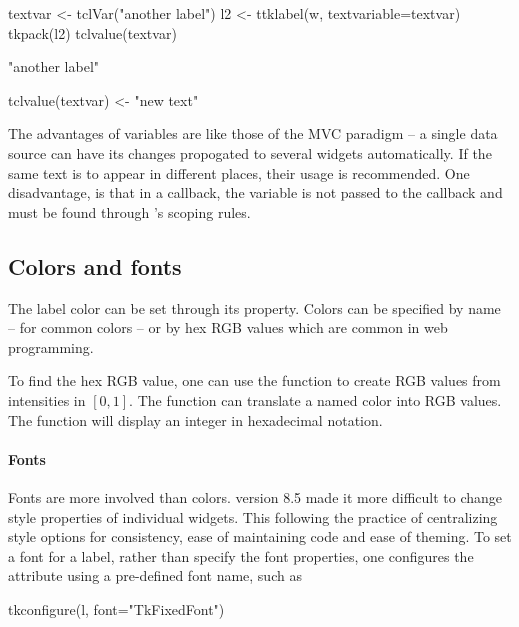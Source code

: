 \begin{Schunk}
\begin{Sinput}
 textvar <- tclVar("another label")
 l2 <- ttklabel(w, textvariable=textvar)
 tkpack(l2)
 tclvalue(textvar)
\end{Sinput}
\begin{Soutput}
[1] "another label"
\end{Soutput}
\begin{Sinput}
 tclvalue(textvar) <- "new text"         
\end{Sinput}
\end{Schunk}

The advantages of \TCL\/ variables are like those of the MVC paradigm
-- a single data source can have its changes propogated to several
widgets automatically. If the same text is to appear in different
places, their usage is recommended.  One disadvantage, is that in a
callback, the variable is not passed to the callback and must be found
through \R's scoping rules.

\subsection{Colors and fonts}
\label{sec:tcltk:overview:colors-fonts}

The label color can be set through its 
property. Colors can be specified by name -- for common colors -- or
by hex RGB values which are common in web programming.
\begin{Schunk}
\end{Schunk}

To find the hex RGB value, one can use the  function to
create RGB values from intensities in $[0,1]$.  The \R\/ function
 can translate a named color into RGB values. The
 function will display an integer in hexadecimal
notation.

\paragraph{Fonts}
Fonts are more involved than colors. \TK\/ version 8.5 made it more
difficult to change style properties of individual widgets. This
following the practice of centralizing style options for consistency,
ease of maintaining code and ease of theming.  To set a font for a
label, rather than specify the font properties, one configures the
 attribute using a pre-defined font name, such as
\begin{Schunk}
\begin{Sinput}
 tkconfigure(l, font="TkFixedFont")
\end{Sinput}
\end{Schunk}

